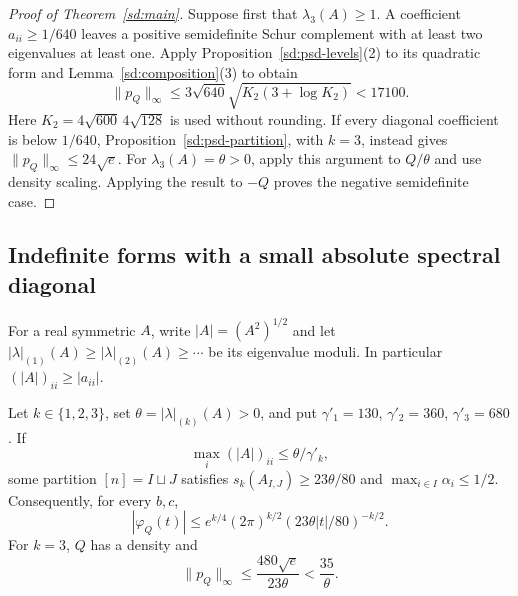 \begin{proof}[Proof of Theorem~\ref{sd:main}]
Suppose first that $\lambda_3(A)\geq1$.  A coefficient
$a_{ii}\geq1/640$ leaves a positive semidefinite Schur complement
with at least two eigenvalues at least one.
Apply Proposition~\ref{sd:psd-levels}(2) to its quadratic form and
Lemma~\ref{sd:composition}(3) to obtain
\[
 \|p_Q\|_\infty\leq
 3\sqrt{640}\sqrt{K_2(3+\log K_2)}<17100.
\]
Here $K_2=4\sqrt{600}\,4\sqrt{128}$ is used without rounding.
If every diagonal coefficient is below $1/640$,
Proposition~\ref{sd:psd-partition}, with $k=3$, instead gives
$\|p_Q\|_\infty\leq24\sqrt e$.
For $\lambda_3(A)=\theta>0$, apply this argument to $Q/\theta$
and use density scaling.  Applying the result to $-Q$ proves
the negative semidefinite case.
\end{proof}

\subsection{Indefinite forms with a small absolute spectral diagonal}
For a real symmetric $A$, write $|A|=(A^2)^{1/2}$ and let
$|\lambda|_{(1)}(A)\geq|\lambda|_{(2)}(A)\geq\cdots$
be its eigenvalue moduli.  In particular $(|A|)_{ii}\geq|a_{ii}|$.

\begin{theorem}\label{sd:indefinite}
Let $k\in\{1,2,3\}$, set $\theta=|\lambda|_{(k)}(A)>0$, and put
$\gamma'_1=130$, $\gamma'_2=360$, $\gamma'_3=680$.
If
\begin{equation}\label{sd:absolute-spread}
 \max_i(|A|)_{ii}\leq\theta/\gamma'_k,
\end{equation}
some partition $[n]=I\sqcup J$ satisfies
$s_k(A_{I,J})\geq23\theta/80$ and
$\max_{i\in I}\alpha_i\leq1/2$.
Consequently, for every $b,c$,
\begin{equation}\label{sd:indefinite-fourier}
 |\varphi_Q(t)|\leq
 e^{k/4}(2\pi)^{k/2}(23\theta|t|/80)^{-k/2}.
\end{equation}
For $k=3$, $Q$ has a density and
\begin{equation}\label{sd:indefinite-density}
 \|p_Q\|_\infty\leq \frac{480\sqrt e}{23\theta}
 <\frac{35}{\theta}.
\end{equation}
\end{theorem}

